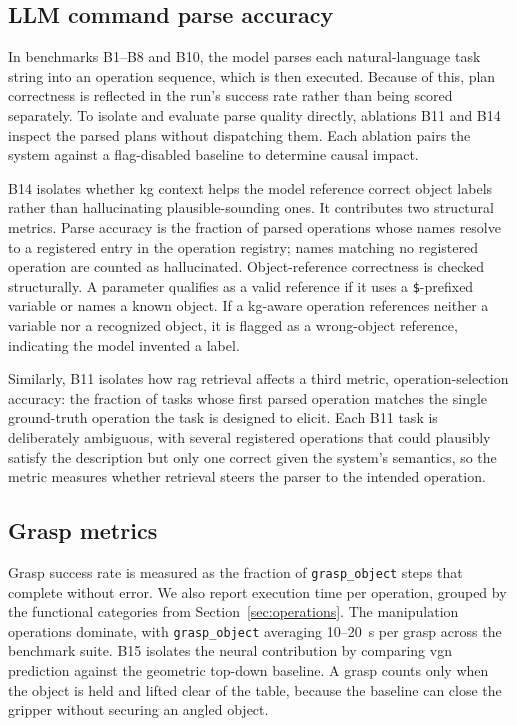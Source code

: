\documentclass[
     12pt,
     a4paper,
     BCOR=10mm,
     DIV=14,
     listof=totoc,
     bibliography=totoc,
     parskip,
     twoside,
     headsepline
     ]{scrreprt}
\begin{document}
\subsection{LLM command parse accuracy}
In benchmarks B1--B8 and B10, the model parses each natural-language task string into an operation sequence, which is then executed. Because of this, plan correctness is reflected in the run's success rate rather than being scored separately. To isolate and evaluate parse quality directly, ablations B11 and B14 inspect the parsed plans without dispatching them. Each ablation pairs the system against a flag-disabled baseline to determine causal impact.

B14 isolates whether \gls{kg} context helps the model reference correct object labels rather than hallucinating plausible-sounding ones. It contributes two structural metrics. Parse accuracy is the fraction of parsed operations whose names resolve to a registered entry in the operation registry; names matching no registered operation are counted as hallucinated. Object-reference correctness is checked structurally. A parameter qualifies as a valid reference if it uses a \texttt{\$}-prefixed variable or names a known object. If a \gls{kg}-aware operation references neither a variable nor a recognized object, it is flagged as a wrong-object reference, indicating the model invented a label.

Similarly, B11 isolates how \gls{rag} retrieval affects a third metric, operation-selection accuracy: the fraction of tasks whose first parsed operation matches the single ground-truth operation the task is designed to elicit. Each B11 task is deliberately ambiguous, with several registered operations that could plausibly satisfy the description but only one correct given the system's semantics, so the metric measures whether retrieval steers the parser to the intended operation.

\subsection{Grasp metrics}
Grasp success rate is measured as the fraction of \texttt{grasp\_object} steps that complete without error. We also report execution time per operation, grouped by the functional categories from Section~\ref{sec:operations}. The manipulation operations dominate, with \texttt{grasp\_object} averaging 10--20~s per grasp across the benchmark suite. B15 isolates the neural contribution by comparing \gls{vgn} prediction against the geometric top-down baseline. A grasp counts only when the object is held and lifted clear of the table, because the baseline can close the gripper without securing an angled object.
\end{document}
